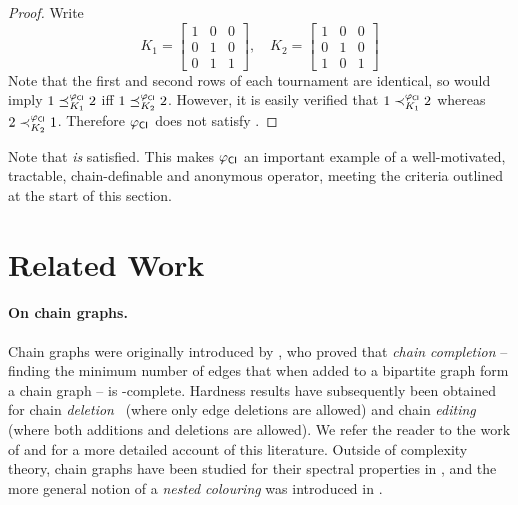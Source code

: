 \begin{proof}
     Write
    \[
        K_1 = \begin{bmatrix}
            1 & 0 & 0 \\
            0 & 1 & 0 \\
            0 & 1 & 1
        \end{bmatrix}
        , \quad
        K_2 = \begin{bmatrix}
            1 & 0 & 0 \\
            0 & 1 & 0 \\
            1 & 0 & 1
        \end{bmatrix}
    \]
    Note that the first and second rows of each tournament are identical, so
     would imply $1 \preceq_{K_1}^{\varphi_{\mathsf{CI}}} 2$ iff $1
    \preceq_{K_2}^{\varphi_{\mathsf{CI}}} 2$.  However, it is easily verified that $1
    \prec_{K_1}^{\varphi_{\mathsf{CI}}} 2$ whereas $2 \prec_{K_2}^{\varphi_{\mathsf{CI}}} 1$. Therefore
    ${\varphi_{\mathsf{CI}}}$ does not satisfy .
\end{proof}
Note that  \emph{is} satisfied. This makes ${\varphi_{\mathsf{CI}}}$ an
important example of a well-motivated, tractable, chain-definable
and anonymous operator, meeting the criteria outlined at the start of
this section.


\section{Related Work}
\label{tourn_sec_related_work}

\paragraph{On chain graphs.}
%
Chain graphs were originally introduced by \textcite{yannakakis1981computing}, who
proved that \emph{chain completion} -- finding the minimum number of edges that
when added to a bipartite graph form a chain graph -- is
-complete. Hardness results have subsequently been obtained
for chain \emph{deletion}~\cite{natanzon2001complexity} (where only edge
deletions are allowed) and chain \emph{editing}~\cite{drange2015threshold}
(where both additions and deletions are allowed). We refer the reader to the
work of \textcite{jiao2017algorithms} and \textcite{drange2015threshold} for a more
detailed account of this literature.
%
Outside of complexity theory, chain graphs have been studied for their spectral
properties in \cite{andelic_2015,ghorbani2017spectral}, and the more general
notion of a \emph{nested colouring} was introduced in \cite{cook2015nested}.

